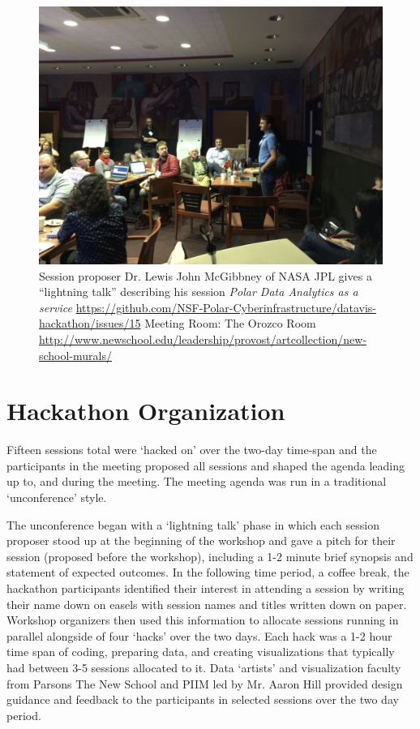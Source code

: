 \documentclass[11pt]{article}
\begin{document}
\begin{figure}[htp]
    \centering
    \includegraphics[width=5in]{figs/fig2.png}
    \caption{Session proposer Dr. Lewis John McGibbney of NASA JPL gives a ``lightning talk'' describing his session {\em Polar Data Analytics as a service} \protect\url{https://github.com/NSF-Polar-Cyberinfrastructure/datavis-hackathon/issues/15} Meeting Room: The Orozco Room \protect\url{http://www.newschool.edu/leadership/provost/artcollection/new-school-murals/}}
    \label{fig:lightning}
\end{figure}


\section{Hackathon Organization}
Fifteen sessions total were `hacked on' over the two-day time-span and the participants in the meeting proposed all sessions and shaped the agenda leading up to, and during the meeting. The meeting agenda was run in a traditional `unconference' style. 

The unconference began with a `lightning talk' phase in which each session proposer stood up at the beginning of the workshop and gave a pitch for their session (proposed before the workshop), including a 1-2 minute brief synopsis and statement of expected outcomes. In the following time period, a coffee break, the hackathon participants identified their interest in attending a session by writing their name down on easels with session names and titles written down on paper. Workshop organizers then used this information to allocate sessions running in parallel alongside of four `hacks' over the two days. Each hack was a 1-2 hour time span of coding, preparing data, and creating visualizations that typically had between 3-5 sessions allocated to it. Data `artists' and visualization faculty from Parsons The New School and PIIM led by Mr. Aaron Hill provided design guidance and feedback to the participants in selected sessions over the two day period.
\end{document}
